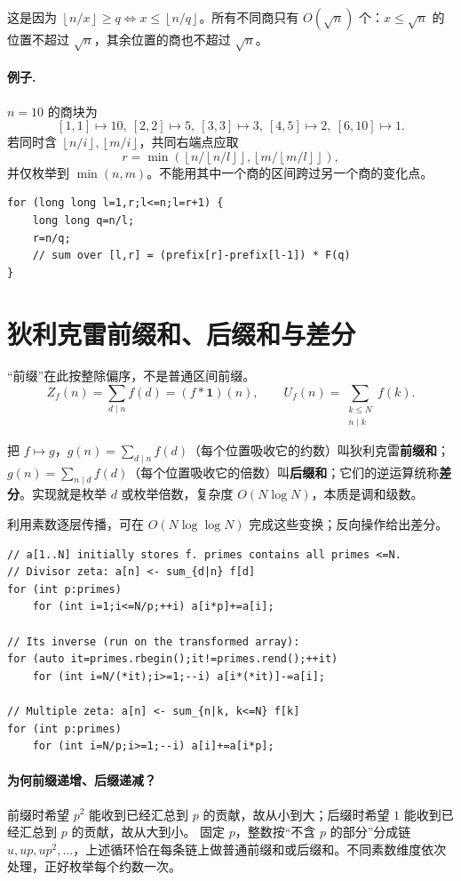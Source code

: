 \documentclass[UTF8,a4paper,11pt,twoside,openright,fontset=fandol]{ctexbook}
\theoremstyle{definition}
\newcommand{\one}{\mathbf 1}
\newcommand{\floor}[1]{\left\lfloor #1\right\rfloor}
\begin{document}
这是因为 $\floor{n/x}\ge q\iff x\le\floor{n/q}$。所有不同商只有 $O(\sqrt n)$ 个：$x\le\sqrt n$ 的位置不超过 $\sqrt n$，其余位置的商也不超过 $\sqrt n$。

\paragraph{例子.} $n=10$ 的商块为
\[
[1,1]\mapsto10,\ [2,2]\mapsto5,\ [3,3]\mapsto3,\ [4,5]\mapsto2,\ [6,10]\mapsto1.
\]
若同时含 $\floor{n/i},\floor{m/i}$，共同右端点应取
\[
 r=\min\left(\floor{n/\floor{n/l}},\floor{m/\floor{m/l}}\right),
\]
并仅枚举到 $\min(n,m)$。不能用其中一个商的区间跨过另一个商的变化点。
\begin{lstlisting}
for (long long l=1,r;l<=n;l=r+1) {
    long long q=n/l;
    r=n/q;
    // sum over [l,r] = (prefix[r]-prefix[l-1]) * F(q)
}
\end{lstlisting}


\section{狄利克雷前缀和、后缀和与差分}
“前缀”在此按整除偏序，不是普通区间前缀。
\[
 Z_f(n)=\sum_{d\mid n}f(d)=(f*\one)(n),\qquad
 U_f(n)=\sum_{\substack{k\le N\\n\mid k}}f(k).
\]

\begin{tip}[这三个词在说什么]
把 $f\mapsto g$，$g(n)=\sum_{d\mid n}f(d)$（每个位置吸收它的约数）叫狄利克雷\textbf{前缀和}；$g(n)=\sum_{n\mid d}f(d)$（每个位置吸收它的倍数）叫\textbf{后缀和}；它们的逆运算统称\textbf{差分}。实现就是枚举 $d$ 或枚举倍数，复杂度 $O(N\log N)$，本质是调和级数。
\end{tip}

利用素数逐层传播，可在 $O(N\log\log N)$ 完成这些变换；反向操作给出差分。


\begin{lstlisting}
// a[1..N] initially stores f. primes contains all primes <=N.
// Divisor zeta: a[n] <- sum_{d|n} f[d]
for (int p:primes)
    for (int i=1;i<=N/p;++i) a[i*p]+=a[i];

// Its inverse (run on the transformed array):
for (auto it=primes.rbegin();it!=primes.rend();++it)
    for (int i=N/(*it);i>=1;--i) a[i*(*it)]-=a[i];

// Multiple zeta: a[n] <- sum_{n|k, k<=N} f[k]
for (int p:primes)
    for (int i=N/p;i>=1;--i) a[i]+=a[i*p];
\end{lstlisting}
\paragraph{为何前缀递增、后缀递减？}
前缀时希望 $p^2$ 能收到已经汇总到 $p$ 的贡献，故从小到大；后缀时希望 $1$ 能收到已经汇总到 $p$ 的贡献，故从大到小。
固定 $p$，整数按“不含 $p$ 的部分”分成链 $u,up,up^2,\ldots$，上述循环恰在每条链上做普通前缀和或后缀和。不同素数维度依次处理，正好枚举每个约数一次。
\end{document}
